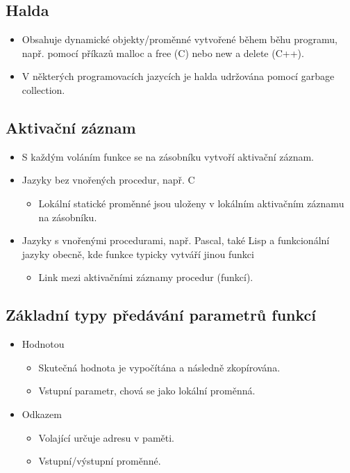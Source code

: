 \documentclass{szzclass}
\begin{document}
\subsection{Halda}
\begin{itemize}
\item Obsahuje dynamické objekty/proměnné vytvořené během běhu programu, např. pomocí příkazů malloc a free (C) nebo new a delete (C++).
\item V některých programovacích jazycích je halda udržována pomocí garbage collection.
\end{itemize}

\subsection{Aktivační záznam}
\begin{itemize}
\item S každým voláním funkce se na zásobníku vytvoří aktivační záznam.
\item Jazyky bez vnořených procedur, např. C
  \begin{itemize}
    \item Lokální statické proměnné jsou uloženy v lokálním aktivačním záznamu na zásobníku.
  \end{itemize}
\item Jazyky s vnořenými procedurami, např. Pascal, také Lisp a funkcionální jazyky obecně, kde funkce typicky vytváří jinou funkci
  \begin{itemize}
    \item Link mezi aktivačními záznamy procedur (funkcí).
  \end{itemize}
\end{itemize}

\subsection{Základní typy předávání parametrů funkcí}
\begin{itemize}
\item Hodnotou
  \begin{itemize}
  \item Skutečná hodnota je vypočítána a následně zkopírována.
  \item Vstupní parametr, chová se jako lokální proměnná.
  \end{itemize}
\item Odkazem
  \begin{itemize}
  \item Volající určuje adresu v paměti.
  \item Vstupní/výstupní proměnné.
  \end{itemize}
\end{itemize}
\end{document}
